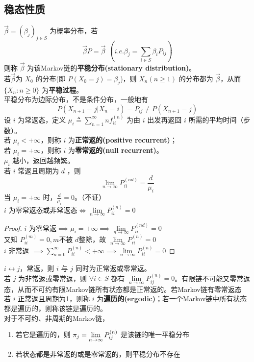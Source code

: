 \documentclass[./main.tex]{subfiles}
\begin{document}
\subsection{稳态性质}
$\vec{\beta}=(\beta_j)_{j\in S}$ 为概率分布，若
$$\vec{\beta}P=\vec{\beta}\ \ (i.e.\beta_j=\sum_{i\in S}\beta_iP_{ij})$$
则称 $\vec{\beta}$ 为该Markov链的\textbf{平稳分布(stationary distribution)}。\\
\indent 若$\vec{\beta}$为 $X_0$ 的分布(即 $P(X_0=j)=\beta_j$)，则 $X_n(n\ge 1)$ 的分布都为 $\vec{\beta}$，从而 $\{X_n:n\ge 0\}$ 为\textbf{平稳过程}。\\
\indent 平稳分布为边际分布，不是条件分布，一般地有 $$P(X_{n+1}=j|X_n=i)=P_{ij}\neq P(X_{n+1}=j)$$
设 $i$ 为常返态，定义 $\mu_{i}\triangleq \sum_{n=1}^{\infty}nf_{ii}^{(n)}$ 为由 $i$ 出发再返回 $i$ 所需的平均时间（步数）。\\
\indent 若 $\mu_i<+\infty$，则称 $i$ 为\textbf{正常返的(positive recurrent)}；\\
\indent 若 $\mu_i=+\infty$，则称 $i$ 为\textbf{零常返的(null recurrent)}。\\
\indent $\mu_i$ 越小，返回越频繁。
\indent \\
若 $i$ 常返且周期为 $d$ ，则
\begin{equation}
    \lim\limits_{n\rightarrow\infty}P_{ii}^{(nd)}=\frac{d}{\mu_i}
\end{equation}
当 $\mu_i=+\infty$ 时，$\frac{d}{\mu_i}=0$。（不证）\\
$i$ 为零常返态或非常返态$\iff\lim\limits_{n\rightarrow \infty}P_{ii}^{(n)}=0$
\begin{proof}
    $i$ 为零常返$\implies\mu_i=+\infty\implies\lim\limits_{n\rightarrow\infty}P_{ii}^{(nd)}=0$\\
    又知 $P_{ii}^{(m)}=0,m$不被 $d$整除，故 $\lim\limits_{n\rightarrow \infty}P_{ii}^{(n)}=0$\\
    $i$ 非常返 $\implies\sum_{n=0}^{\infty}P_{ii}^{(n)}<+\infty\implies\lim\limits_{n\rightarrow\infty}P_{ii}^{(n)}=0$
\end{proof}
$i\leftrightarrow j$，常返，则 $i$ 与 $j$ 同时为正常返或零常返。\\
若 $j$ 为非常返或零常返，则 $\forall i\in S$ 都有 $\lim\limits_{n\rightarrow\infty}P_{ij}^{(n)}=0$。有限链不可能又零常返态，从而不可约有限Markov链所有状态都是正常返的。若Markov链有零常返态\\
若 $i$ 正常返且周期为1，则称 $i$ 为\underline{\textbf{遍历的(ergodic)}}；若一个Markov链中所有状态都是遍历的，则称该链是遍历的。\\
对于不可约、非周期的Markov链，
\begin{enumerate}[(1)]
    \item 若它是遍历的，则 $\pi_j=\lim\limits_{n\rightarrow\infty}P_{ij}^{(n)}$ 是该链的唯一平稳分布
    \item 若状态都是非常返的或是零常返的，则平稳分布不存在
\end{enumerate}
\end{document}
